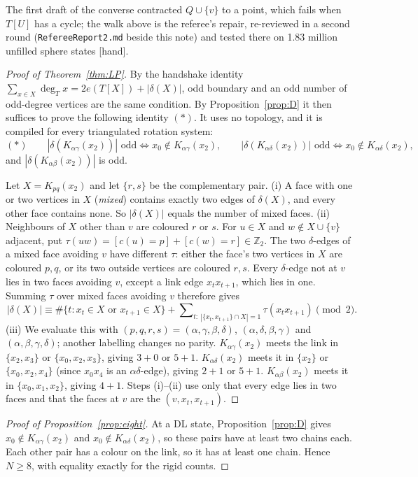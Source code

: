 \documentclass[11pt]{article}
\theoremstyle{definition}
\newcommand{\lab}[1]{\textsf{[#1]}}
\newcommand{\Z}{\mathbb Z}
\begin{document}
The first draft of the converse contracted $Q\cup\{v\}$ to a point, which fails when $T[U]$ has a cycle; the walk above is the referee's repair, re-reviewed in a second round (\texttt{RefereeReport2.md} beside this note) and tested there on 1.83 million unfilled sphere states \lab{hand}.

\begin{proof}[Proof of Theorem~\ref{thm:LP}]
By the handshake identity $\sum_{x\in X}\deg_T x=2e(T[X])+|\delta(X)|$, odd boundary and an odd number of odd-degree vertices are the same condition. By Proposition~\ref{prop:D} it then suffices to prove the following identity $(\ast)$. It uses no topology, and it is compiled for every triangulated rotation system:
\[(\ast)\qquad|\delta(K_{\alpha\gamma}(x_2))|\text{ odd}\iff x_0\notin K_{\alpha\gamma}(x_2),\qquad|\delta(K_{\alpha\delta}(x_2))|\text{ odd}\iff x_0\notin K_{\alpha\delta}(x_2),\]
and $|\delta(K_{\alpha\beta}(x_2))|$ is odd.

Let $X=K_{pq}(x_2)$ and let $\{r,s\}$ be the complementary pair. (i) A face with one or two vertices in $X$ (\emph{mixed}) contains exactly two edges of $\delta(X)$, and every other face contains none. So $|\delta(X)|$ equals the number of mixed faces. (ii) Neighbours of $X$ other than $v$ are coloured $r$ or $s$. For $u\in X$ and $w\notin X\cup\{v\}$ adjacent, put $\tau(uw)=[c(u)=p]+[c(w)=r]\in\Z_2$. The two $\delta$-edges of a mixed face avoiding $v$ have different $\tau$: either the face's two vertices in $X$ are coloured $p,q$, or its two outside vertices are coloured $r,s$. Every $\delta$-edge not at $v$ lies in two faces avoiding $v$, except a link edge $x_tx_{t+1}$, which lies in one. Summing $\tau$ over mixed faces avoiding $v$ therefore gives
\[|\delta(X)|\equiv\#\{t:x_t\in X\text{ or }x_{t+1}\in X\}+\sum\nolimits_{t:\ |\{x_t,x_{t+1}\}\cap X|=1}\tau(x_tx_{t+1})\pmod 2 .\]
(iii) We evaluate this with $(p,q,r,s)=(\alpha,\gamma,\beta,\delta)$, $(\alpha,\delta,\beta,\gamma)$ and $(\alpha,\beta,\gamma,\delta)$; another labelling changes no parity. $K_{\alpha\gamma}(x_2)$ meets the link in $\{x_2,x_3\}$ or $\{x_0,x_2,x_3\}$, giving $3+0$ or $5+1$. $K_{\alpha\delta}(x_2)$ meets it in $\{x_2\}$ or $\{x_0,x_2,x_4\}$ (since $x_0x_4$ is an $\alpha\delta$-edge), giving $2+1$ or $5+1$. $K_{\alpha\beta}(x_2)$ meets it in $\{x_0,x_1,x_2\}$, giving $4+1$. Steps (i)--(ii) use only that every edge lies in two faces and that the faces at $v$ are the $(v,x_t,x_{t+1})$.
\end{proof}

\begin{proof}[Proof of Proposition~\ref{prop:eight}]
At a DL state, Proposition~\ref{prop:D} gives $x_0\notin K_{\alpha\gamma}(x_2)$ and $x_0\notin K_{\alpha\delta}(x_2)$, so these pairs have at least two chains each. Each other pair has a colour on the link, so it has at least one chain. Hence $N\ge 8$, with equality exactly for the rigid counts.
\end{proof}
\end{document}

